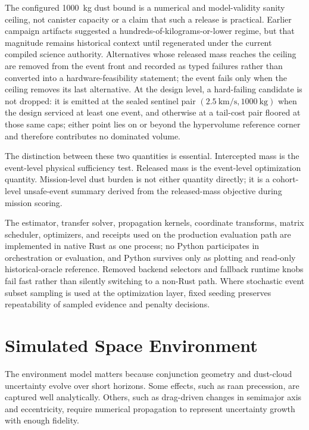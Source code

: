     The configured \SI{1000}{\kilogram} dust bound is a numerical and model-validity sanity ceiling, not canister capacity or a claim that such a release is practical. Earlier campaign artifacts suggested a hundreds-of-kilograms-or-lower regime, but that magnitude remains historical context until regenerated under the current compiled science authority. Alternatives whose released mass reaches the ceiling are removed from the event front and recorded as typed failures rather than converted into a hardware-feasibility statement; the event fails only when the ceiling removes its last alternative. At the design level, a hard-failing candidate is not dropped: it is emitted at the sealed sentinel pair \((\SI{2.5}{\kilo\metre\per\second},\SI{1000}{\kilogram})\) when the design serviced at least one event, and otherwise at a tail-cost pair floored at those same caps; either point lies on or beyond the hypervolume reference corner and therefore contributes no dominated volume.

    The distinction between these two quantities is essential. Intercepted mass is the event-level physical sufficiency test. Released mass is the event-level optimization quantity. Mission-level dust burden is not either quantity directly; it is a cohort-level unsafe-event summary derived from the released-mass objective during mission scoring.

    The estimator, transfer solver, propagation kernels, coordinate transforms, matrix scheduler, optimizers, and receipts used on the production evaluation path are implemented in native Rust as one process; no Python participates in orchestration or evaluation, and Python survives only as plotting and read-only historical-oracle reference. Removed backend selectors and fallback runtime knobs fail fast rather than silently switching to a non-Rust path. Where stochastic event subset sampling is used at the optimization layer, fixed seeding preserves repeatability of sampled evidence and penalty decisions.

    \clearpage

\section{Simulated Space Environment} \label{se:simulation}
    The environment model matters because conjunction geometry and dust-cloud uncertainty evolve over short horizons. Some effects, such as \gls{raan} precession, are captured well analytically. Others, such as drag-driven changes in semimajor axis and eccentricity, require numerical propagation to represent uncertainty growth with enough fidelity.

